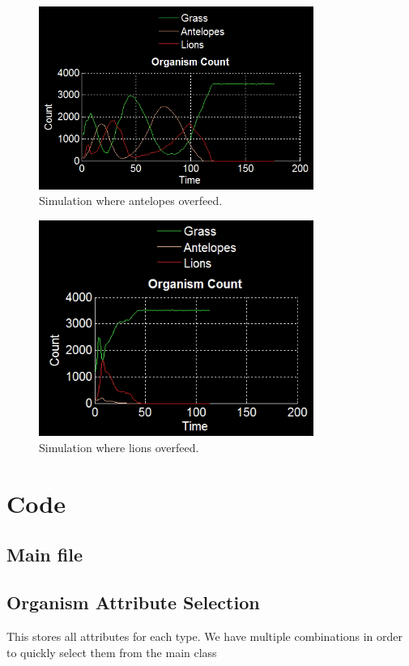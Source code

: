 \documentclass[11pt]{article}
\begin{document}
\begin{figure}
\centering
\includegraphics[width=0.8\textwidth]{AnteOverfeed}
\caption{Simulation where antelopes overfeed.}
\label{fig:anteOverfeed}
\end{figure}

\begin{figure}
\centering
\includegraphics[width=0.8\textwidth]{LionsOverfeed}
\caption{Simulation where lions overfeed.}
\label{fig:lionOverfeed}
\end{figure}
\section{Code}
\subsection{Main file}

\subsection{Organism Attribute Selection}
This stores all attributes for each type. We have multiple combinations in order to quickly select them from the main class

\end{document}
